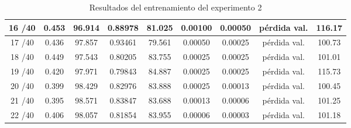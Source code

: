 \begin{table}[ht]
\begin{tabular}{|c|c|c|c|c|c|c|c|c|}
            16 /40 & 0.453  & 96.914 & 0.88978 & 81.025 & 0.00100 & 0.00050 & pérdida val. & 116.17 \\ \hline
            17 /40 & 0.436  & 97.857 & 0.93461 & 79.561 & 0.00050 & 0.00025 & pérdida val. & 100.73 \\ \hline
            18 /40 & 0.449  & 97.543 & 0.80205 & 83.755 & 0.00025 & 0.00025 & pérdida val. & 101.01 \\ \hline
            19 /40 & 0.420  & 97.971 & 0.79843 & 84.887 & 0.00025 & 0.00025 & pérdida val. & 115.73 \\ \hline
            20 /40 & 0.399  & 98.429 & 0.82976 & 83.888 & 0.00025 & 0.00013 & pérdida val. & 100.45 \\ \hline
            21 /40 & 0.395  & 98.571 & 0.83847 & 83.688 & 0.00013 & 0.00006 & pérdida val. & 101.25 \\ \hline
            22 /40 & 0.406  & 98.057 & 0.81854 & 83.955 & 0.00006 & 0.00003 & pérdida val. & 101.18 \\ \hline
            \end{tabular}
            \caption{Resultados del entrenamiento del experimento 2}
            \label{tab:training_results_b2}
            \end{table}
            